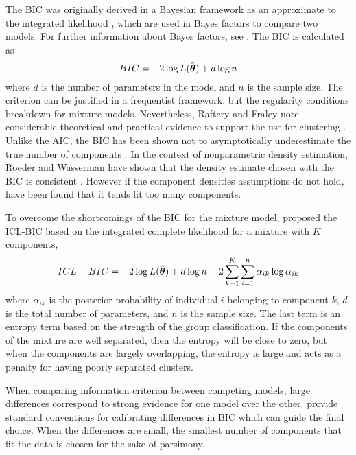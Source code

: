 The BIC was originally derived in a Bayesian framework as an approximate to the integrated likelihood  \cite{schwarz1978}, which are used in Bayes factors to compare two models. For further information about Bayes factors, see \textcite{kass1995}. The BIC is calculated as
$$BIC= -2 \log L(\hat{\boldsymbol\theta}) + d\log n $$
where $d$ is the number of parameters in the model and $n$ is the sample size. The criterion can be justified in a frequentist framework, but the regularity conditions breakdown for mixture models. Nevertheless, Raftery and Fraley note considerable theoretical and practical evidence to support the use for clustering \cite{fraley1998}. Unlike the AIC, the BIC has been shown not to asymptotically underestimate the true number of components \cite{leroux1992}. In the context of nonparametric density estimation, Roeder and Wasserman have shown that the density estimate chosen with the BIC is consistent \cite{roeder1997}. However if the component densities assumptions do not hold, \textcite{biernacki2000} have been found that it tends fit too many components. 

To overcome the shortcomings of the BIC for the mixture model, \textcite{biernacki2000} proposed the ICL-BIC based on the integrated complete likelihood for a mixture with $K$ components,
$$ICL-BIC = -2\log L(\hat{\boldsymbol\theta}) + d\log n - 2\sum^{K}_{k=1}\sum^{n}_{i=1}\alpha_{ik}\log \alpha_{ik}$$
where $\alpha_{ik}$ is the posterior probability of individual $i$ belonging to component $k$, $d$ is the total number of parameters, and $n$ is the sample size. The last term is an entropy term based on the strength of the group classification. If the components of the mixture are well separated, then the entropy will be close to zero, but when the components are largely overlapping, the entropy is large and acts as a penalty for having poorly separated clusters. 

When comparing information criterion between competing models, large differences correspond to strong evidence for one model over the other. \textcite{kass1995} provide standard conventions for calibrating differences in BIC which can guide the final choice. When the differences are small, the smallest number of components that fit the data is chosen for the sake of parsimony.

